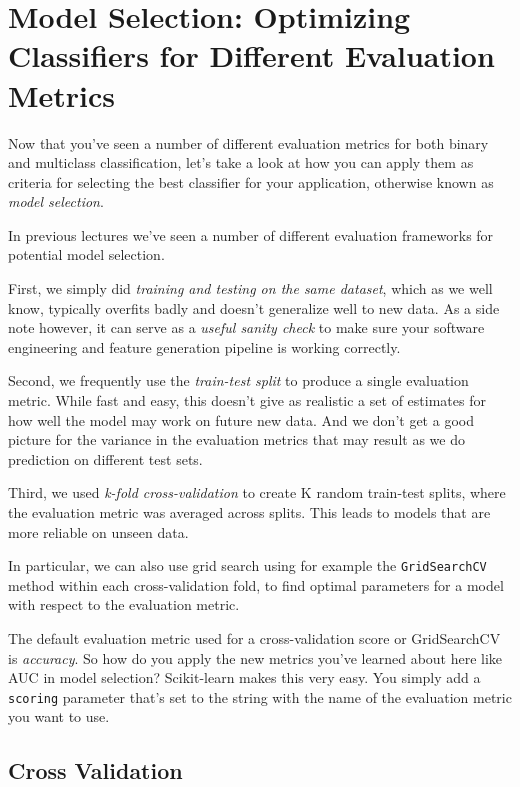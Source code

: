 \section{Model Selection: Optimizing Classifiers for Different Evaluation Metrics}
\begin{multicols}{2}

Now that you've seen a number of different evaluation metrics for both binary and multiclass classification, let's take a look at how you can apply them as criteria for selecting the best classifier for your application, otherwise known as \emph{model selection}. 

In previous lectures we've seen a number of different evaluation frameworks for potential model selection. 

First, we simply did \emph{training and testing on the same dataset}, which as we well know, typically overfits badly and doesn't generalize well to new data. As a side note however, it can serve as a \emph{useful sanity check} to make sure your software engineering and feature generation pipeline is working correctly. 

Second, we frequently use the \emph{train-test split} to produce a single evaluation metric. While fast and easy, this doesn't give as realistic a set of estimates for how well the model may work on future new data. And we don't get a good picture for the variance in the evaluation metrics that may result as we do prediction on different test sets. 

Third, we used \emph{k-fold cross-validation} to create K random train-test splits, where the evaluation metric was averaged across splits. This leads to models that are more reliable on unseen data. 

In particular, we can also use grid search using for example the \texttt{GridSearchCV} method within each cross-validation fold, to find optimal parameters for a model with respect to the evaluation metric.

The default evaluation metric used for a cross-validation score or GridSearchCV is \emph{accuracy}. So how do you apply the new metrics you've learned about here like AUC in model selection? Scikit-learn makes this very easy. You simply add a \texttt{scoring} parameter that's set to the string with the name of the evaluation metric you want to use. 

\subsection{Cross Validation}


\end{multicols}
